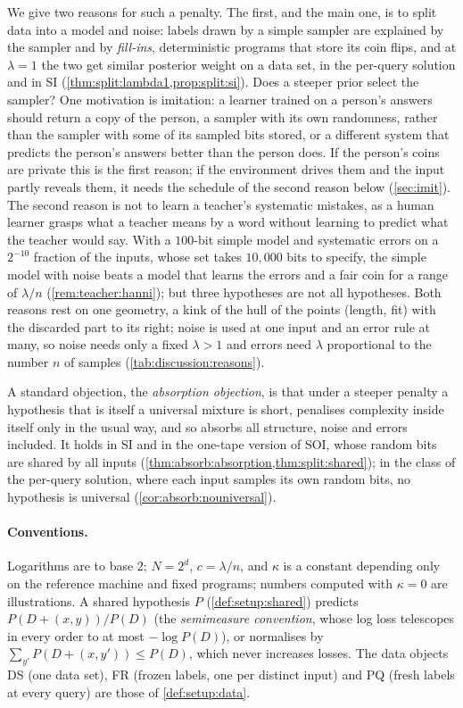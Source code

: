 We give two reasons for such a penalty. The first, and the main one, is to split data into a model and noise: labels drawn by a simple sampler are explained by the sampler and by \emph{fill-ins}, deterministic programs that store its coin flips, and at $\lambda=1$ the two get similar posterior weight on a data set, in the per-query solution and in SI (\cref{thm:split:lambda1,prop:split:si}). Does a steeper prior select the sampler? One motivation is imitation: a learner trained on a person's answers should return a copy of the person, a sampler with its own randomness, rather than the sampler with some of its sampled bits stored, or a different system that predicts the person's answers better than the person does. If the person's coins are private this is the first reason; if the environment drives them and the input partly reveals them, it needs the schedule of the second reason below (\cref{sec:imit}). The second reason is not to learn a teacher's systematic mistakes, as a human learner grasps what a teacher means by a word without learning to predict what the teacher would say. With a $100$-bit simple model and systematic errors on a $2^{-10}$ fraction of the inputs, whose set takes $10{,}000$ bits to specify, the simple model with noise beats a model that learns the errors and a fair coin for a range of $\lambda/n$ (\cref{rem:teacher:hanni}); but three hypotheses are not all hypotheses. Both reasons rest on one geometry, a kink of the hull of the points (length, fit) with the discarded part to its right; noise is used at one input and an error rule at many, so noise needs only a fixed $\lambda>1$ and errors need $\lambda$ proportional to the number $n$ of samples (\cref{tab:discussion:reasons}).

A standard objection, the \emph{absorption objection}, is that under a steeper penalty a hypothesis that is itself a universal mixture is short, penalises complexity inside itself only in the usual way, and so absorbs all structure, noise and errors included. It holds in SI and in the one-tape version of SOI, whose random bits are shared by all inputs (\cref{thm:absorb:absorption,thm:split:shared}); in the class of the per-query solution, where each input samples its own random bits, no hypothesis is universal (\cref{cor:absorb:nouniversal}).

\paragraph{Conventions.} Logarithms are to base $2$; $N=2^d$, $c=\lambda/n$, and $\kappa$ is a constant depending only on the reference machine and fixed programs; numbers computed with $\kappa=0$ are illustrations. A shared hypothesis $P$ (\cref{def:setup:shared}) predicts $P(D+(x,y))/P(D)$ (the \emph{semimeasure convention}, whose log loss telescopes in every order to at most $-\log P(D)$), or normalises by $\sum_{y'}P(D+(x,y'))\le P(D)$, which never increases losses. The data objects DS (one data set), FR (frozen labels, one per distinct input) and PQ (fresh labels at every query) are those of \cref{def:setup:data}.

